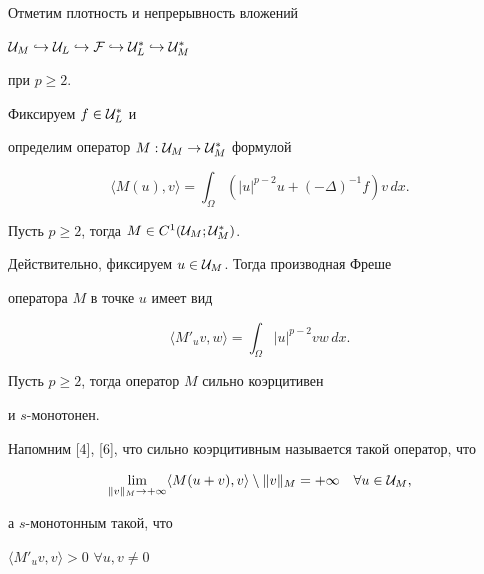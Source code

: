 Отметим плотность и непрерывность вложений


${\cal U}_M\hookrightarrow {\cal U}_L \hookrightarrow{\cal F}\hookrightarrow


{\cal U}_L^*\hookrightarrow {\cal U}_M^*$


при $p\ge 2$.


Фиксируем $f\in {\cal U}_L^*$ и


определим оператор $M : {\cal U}_M\to {\cal U}_M^* $ формулой


$$


\langle M(u), v\rangle=\int_\Omega (|u|^{p-2} u+(-\Delta)^{-1} f) v\,dx.


$$





\begin{lems}


Пусть $p\ge 2$, тогда $M\in C^1 ({\cal U}_M; {\cal U}_M^*)$.


\end{lems}





Действительно, фиксируем $u\in{\cal U}_M$. Тогда производная Фреше


оператора $M$ в точке $u$ имеет вид


$$


\langle M'_uv, w\rangle = \int_\Omega |u|^{p-2} vw\,dx.


$$





\begin{lems}


Пусть $p\ge 2$, тогда оператор $M$ сильно коэрцитивен


и $s$-монотонен.


\end{lems}





Напомним [4], [6], что сильно коэрцитивным называется такой оператор, что


$$


\lim_{\|v\|_M\to +\infty} \langle M(u+v), v\rangle \setminus \|v\|_M=+\infty


\quad \forall u\in {\cal U}_M,


$$


а $s$-монотонным такой, что


$\langle M'_uv, v\rangle>0$\; $\forall u, v \neq 0$


